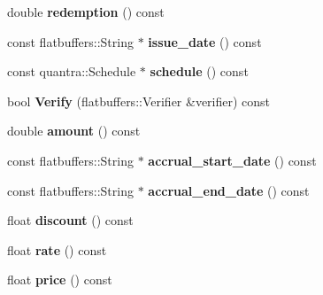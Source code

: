 \begin{DoxyCompactItemize}
double {\bfseries redemption} () const
\item 
\mbox{\label{structquantra_1_1FLATBUFFERS__FINAL__CLASS_adf3517b162e1be9f52e6c0de30b15ab4}} 
const flatbuffers\+::\+String $\ast$ {\bfseries issue\+\_\+date} () const
\item 
\mbox{\label{structquantra_1_1FLATBUFFERS__FINAL__CLASS_a4980a75c547328bfac97fa23df17d655}} 
const quantra\+::\+Schedule $\ast$ {\bfseries schedule} () const
\item 
\mbox{\label{structquantra_1_1FLATBUFFERS__FINAL__CLASS_aed693ee5a45b5f53af7411f9cab6793a}} 
bool {\bfseries Verify} (flatbuffers\+::\+Verifier \&verifier) const
\item 
\mbox{\label{structquantra_1_1FLATBUFFERS__FINAL__CLASS_a166da80825220ec9e04580d3aba13aca}} 
double {\bfseries amount} () const
\item 
\mbox{\label{structquantra_1_1FLATBUFFERS__FINAL__CLASS_add6840ddd841ee55494f311eb59a6af6}} 
const flatbuffers\+::\+String $\ast$ {\bfseries accrual\+\_\+start\+\_\+date} () const
\item 
\mbox{\label{structquantra_1_1FLATBUFFERS__FINAL__CLASS_a9d0add6a4e2e5f6895c03c992fe74485}} 
const flatbuffers\+::\+String $\ast$ {\bfseries accrual\+\_\+end\+\_\+date} () const
\item 
\mbox{\label{structquantra_1_1FLATBUFFERS__FINAL__CLASS_aecb95f6e465c3d9921a452b43fade4ed}} 
float {\bfseries discount} () const
\item 
\mbox{\label{structquantra_1_1FLATBUFFERS__FINAL__CLASS_aa5a25f3bfb8a4b4822cb5fcb1b479ff8}} 
float {\bfseries rate} () const
\item 
\mbox{\label{structquantra_1_1FLATBUFFERS__FINAL__CLASS_afbd77034b48d3fee2f27dad0ac3503f1}} 
float {\bfseries price} () const

\end{DoxyCompactItemize}
